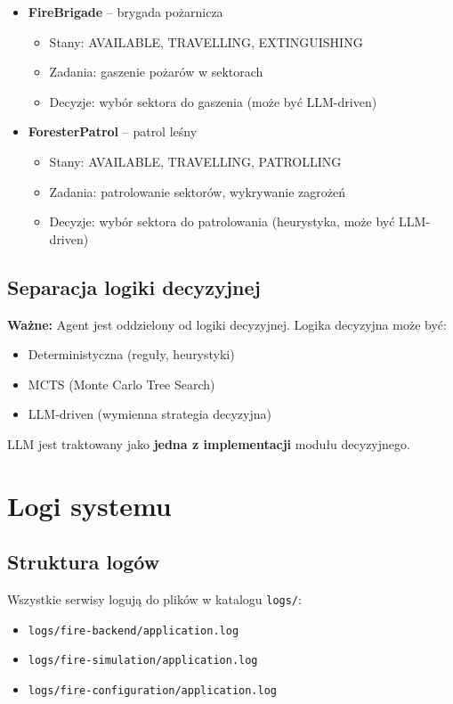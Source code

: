 \documentclass[11pt,a4paper]{article}
\begin{document}
\begin{itemize}
    \item \textbf{FireBrigade} -- brygada pożarnicza
    \begin{itemize}
        \item Stany: AVAILABLE, TRAVELLING, EXTINGUISHING
        \item Zadania: gaszenie pożarów w sektorach
        \item Decyzje: wybór sektora do gaszenia (może być LLM-driven)
    \end{itemize}
    
    \item \textbf{ForesterPatrol} -- patrol leśny
    \begin{itemize}
        \item Stany: AVAILABLE, TRAVELLING, PATROLLING
        \item Zadania: patrolowanie sektorów, wykrywanie zagrożeń
        \item Decyzje: wybór sektora do patrolowania (heurystyka, może być LLM-driven)
    \end{itemize}
\end{itemize}

\subsection{Separacja logiki decyzyjnej}

\textbf{Ważne:} Agent jest oddzielony od logiki decyzyjnej. Logika decyzyjna może być:
\begin{itemize}
    \item Deterministyczna (reguły, heurystyki)
    \item MCTS (Monte Carlo Tree Search)
    \item LLM-driven (wymienna strategia decyzyjna)
\end{itemize}

LLM jest traktowany jako \textbf{jedna z implementacji} modułu decyzyjnego.

\section{Logi systemu}

\subsection{Struktura logów}

Wszystkie serwisy logują do plików w katalogu \texttt{logs/}:
\begin{itemize}
    \item \texttt{logs/fire-backend/application.log}
    \item \texttt{logs/fire-simulation/application.log}
    \item \texttt{logs/fire-configuration/application.log}
\end{itemize}
\end{document}

